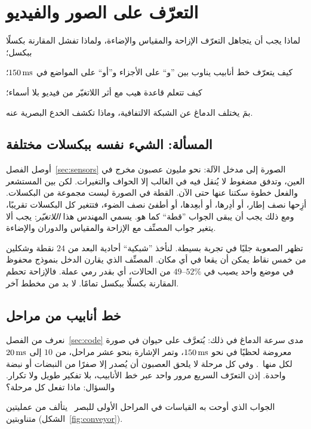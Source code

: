 \chapter{التعرّف على الصور والفيديو}
\label{sec:recognition}
\begin{chaptergoals}
\item لماذا يجب أن يتجاهل التعرّف الإزاحة والمقياس والإضاءة، ولماذا تفشل المقارنة بكسلًا ببكسل؛
\item كيف يتعرّف خط أنابيب يناوب بين ”و“ على الأجزاء و”أو“ على المواضع في $150\,\text{ms}$؛
\item كيف تتعلم قاعدة هيب مع أثر اللاتغيّر من فيديو بلا أسماء؛
\item بمَ يختلف الدماغ عن الشبكة الالتفافية، وماذا تكشف الخدع البصرية عنه.
\end{chaptergoals}

\section{المسألة: الشيء نفسه ببكسلات مختلفة}

أوصل الفصل~\ref{sec:sensors} الصورة إلى مدخل الآلة: نحو مليون عصبون مخرج في العين، وتدفق مضغوط لا يُنقل فيه في الغالب إلا الحواف والتغيرات. لكن بين المستشعر والفعل خطوة سكتنا عنها حتى الآن. القطة في الصورة ليست مجموعة من البكسلات. أزِحها نصف إطار، أو أدِرها، أو أبعِدها، أو أطفئ نصف الضوء، فتتغير كل البكسلات تقريبًا، ومع ذلك يجب أن يبقى الجواب ”قطة“ كما هو. يسمي المهندس هذا \emph{اللاتغيّر}: يجب ألا يتغير جواب المصنِّف مع الإزاحة والمقياس والدوران والإضاءة.

تظهر الصعوبة جليًا في تجربة بسيطة. لنأخذ ”شبكية“ أحادية البعد من $24$ نقطة وشكلين من خمس نقاط يمكن أن يقعا في أي مكان. المصنِّف الذي يقارن الدخل بنموذج محفوظ في موضع واحد يصيب في $49\text{--}52\%$ من الحالات، أي بقدر رمي عملة. فالإزاحة تحطم المقارنة بكسلًا ببكسل تمامًا. لا بد من مخطط آخر.

\section{خط أنابيب من مراحل}

نعرف من الفصل~\ref{sec:code} مدى سرعة الدماغ في ذلك: يُتعرَّف على حيوان في صورة معروضة لحظيًا في نحو $150\,\text{ms}$، وتمر الإشارة بنحو عشر مراحل، من $10$ إلى $20\,\text{ms}$ لكل منها~\cite{Thorpe1996}. وفي كل مرحلة لا يلحق العصبون أن يُصدر إلا صفرًا من النبضات أو نبضة واحدة. إذن التعرّف السريع مرور واحد عبر خط الأنابيب، بلا تفكير طويل ولا تكرار. والسؤال: ماذا تفعل كل مرحلة؟

الجواب الذي أوحت به القياسات في المراحل الأولى للبصر~\cite{HubelWiesel1962} يتألف من عمليتين متناوبتين (الشكل~\ref{fig:conveyor}).

